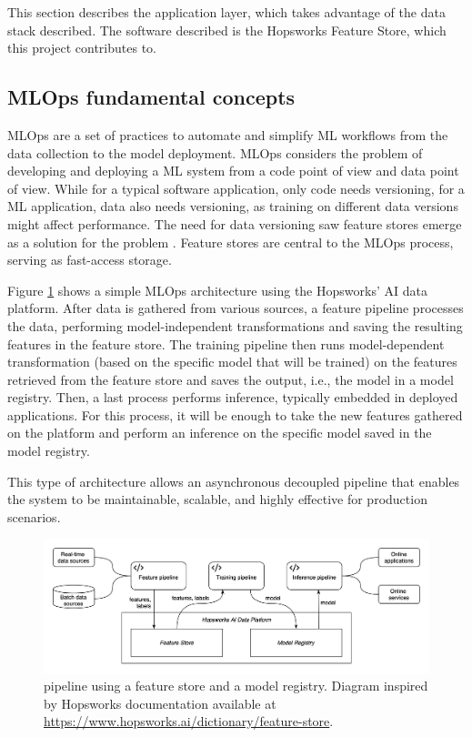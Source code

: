 This section describes the application layer, which takes advantage of the data stack described. The software described is the Hopsworks Feature Store, which this project contributes to.

\subsection{MLOps fundamental concepts}

\gls{MLOps} are a set of practices to automate and simplify \gls{ML} workflows from the data collection to the model deployment. \gls{MLOps} considers the problem of developing and deploying a \gls{ML} system from a code point of view and data point of view. While for a typical software application, only code needs versioning, for a \gls{ML} application, data also needs versioning, as training on different data versions might affect performance. The need for data versioning saw feature stores emerge as a solution for the problem \cite{MeetMichelangeloUbers2017}. Feature stores are central to the \gls{MLOps} process, serving as fast-access storage.

Figure \ref{fig:mlops} shows a simple \gls{MLOps} architecture using the Hopsworks' AI data platform. After data is gathered from various sources, a feature pipeline processes the data, performing model-independent transformations and saving the resulting features in the feature store. The training pipeline then runs model-dependent transformation (based on the specific model that will be trained) on the features retrieved from the feature store and saves the output, i.e., the model in a model registry. Then, a last process performs inference, typically embedded in deployed applications. For this process, it will be enough to take the new features gathered on the platform and perform an inference on the specific model saved in the model registry.

This type of architecture allows an asynchronous decoupled pipeline that enables the system to be maintainable, scalable, and highly effective for production scenarios.

\begin{figure}[!ht]
    \begin{center}
      \includegraphics[width=\textwidth]{figures/2-background/MLOps.png}
    \end{center}
    \caption[Feature store in an MLOps pipeline]{ pipeline using a feature store and a model registry. Diagram inspired by Hopsworks documentation available at \url{https://www.hopsworks.ai/dictionary/feature-store}.}
    \label{fig:mlops}
\end{figure}


